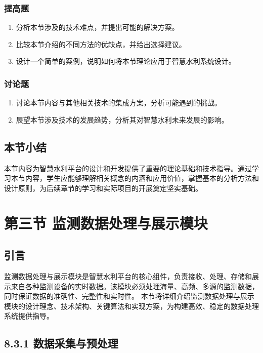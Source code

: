\subsubsection{提高题}\label{ux63d0ux9ad8ux9898} \begin{enumerate} \def\labelenumi{\arabic{enumi}.} \tightlist \item
分析本节涉及的技术难点，并提出可能的解决方案。 \item 比较本节介绍的不同方法的优缺点，并给出选择建议。 \item 设计一个简单的案例，说明如何将本节理论应用于智慧水利系统设计。 \end{enumerate}
\subsubsection{讨论题}\label{ux8ba8ux8bbaux9898} \begin{enumerate} \def\labelenumi{\arabic{enumi}.} \tightlist \item
讨论本节内容与其他相关技术的集成方案，分析可能遇到的挑战。 \item 展望本节涉及技术的发展趋势，分析其对智慧水利未来发展的影响。 \end{enumerate}
\subsection{本节小结}\label{ux672cux8282ux5c0fux7ed3}
本节内容为智慧水利平台的设计和开发提供了重要的理论基础和技术指导。通过学习本节内容，学生应能够理解相关概念的内涵和应用价值，掌握基本的分析方法和设计原则，为后续章节的学习和实际项目的开展奠定坚实基础。 \section{第三节
监测数据处理与展示模块}\label{ux7b2cux4e09ux8282-ux76d1ux6d4bux6570ux636eux5904ux7406ux4e0eux5c55ux793aux6a21ux5757}
\subsection{引言}\label{ux5f15ux8a00-2}
监测数据处理与展示模块是智慧水利平台的核心组件，负责接收、处理、存储和展示来自各种监测设备的实时数据。该模块必须处理海量、高频、多源的监测数据，同时保证数据的准确性、完整性和实时性。
本节将详细介绍监测数据处理与展示模块的设计理念、技术架构、关键算法和实现方案，为构建高效、稳定的数据处理系统提供指导。 \subsection{8.3.1
数据采集与预处理}\label{ux6570ux636eux91c7ux96c6ux4e0eux9884ux5904ux7406}
